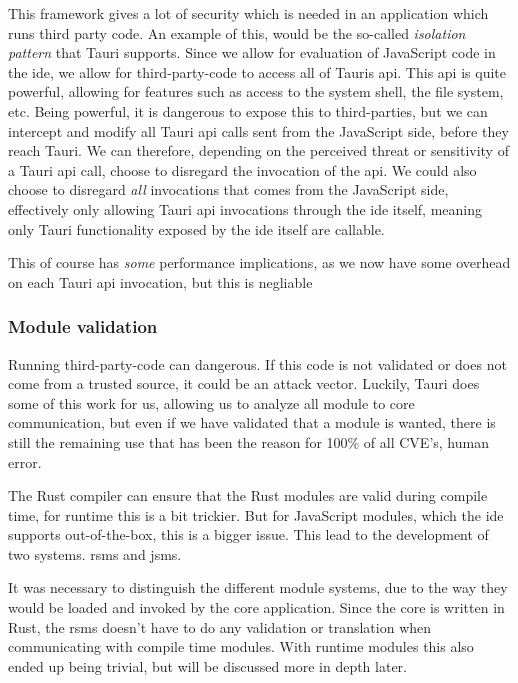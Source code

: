This framework gives a lot of security which is needed in an
application which runs third party code. An example of this, would be the
so-called \textit{isolation pattern} that Tauri supports. Since we allow for
evaluation of JavaScript code in the \gls*{ide}, we allow for third-party-code to
access all of Tauris \gls*{api}. This \gls*{api} is quite powerful, allowing for
features such as access to the system shell, the file system, etc. Being
powerful, it is dangerous to expose this to third-parties, but we can
intercept and modify all Tauri \gls*{api} calls sent from the JavaScript side,
before they reach Tauri. We can therefore, depending on the perceived threat or
sensitivity of a Tauri \gls*{api} call, choose to disregard the invocation of the
\gls*{api}. We could also choose to disregard \textit{all} invocations that comes
from the JavaScript side, effectively only allowing Tauri \gls*{api} invocations
through the \gls*{ide} itself, meaning only Tauri functionality exposed by the
\gls*{ide} itself are callable.

This of course has \textit{some} performance implications, as we now have some overhead on
each Tauri \gls*{api} invocation, but this is negliable\footnotemark{}


\subsubsection{Module validation}

Running third-party-code can dangerous. If this code is not validated or does
not come from a trusted source, it could be an attack vector. Luckily, Tauri does
some of this work for us, allowing us to analyze all module to core
communication, but even if we have validated that a module is wanted, there is
still the remaining use that has been the reason for 100\% of all CVE's, human
error.

The Rust compiler can ensure that the Rust modules are valid during compile
time, for runtime this is a bit trickier. But for JavaScript modules, which the
\gls*{ide} supports out-of-the-box, this is a bigger issue. This lead to the
development of two systems. \gls*{rsms} and \gls*{jsms}.

It was necessary to distinguish the different module systems, due to the way
they would be loaded and invoked by the core application. Since the core is
written in Rust, the \gls*{rsms} doesn't have to do any validation or
translation when communicating with compile time modules. With runtime modules
this also ended up being trivial, but will be discussed more in depth later.

